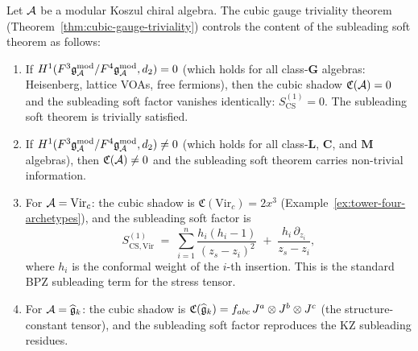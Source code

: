 \begin{theorem}
\label{thm:thqg-VI-cubic-gauge-triviality}
Let $\mathcal{A}$ be a modular Koszul chiral algebra.
The cubic gauge triviality theorem
(Theorem~\ref{thm:cubic-gauge-triviality}) controls the content
of the subleading soft theorem as follows:
\begin{enumerate}[label=\textup{(\roman*)}]
\item If $H^1(F^3\mathfrak{g}_{\mathcal{A}}^{\mathrm{mod}}/F^4\mathfrak{g}_{\mathcal{A}}^{\mathrm{mod}}, d_2) = 0$ (which holds for all
 class-$\mathbf{G}$ algebras: Heisenberg, lattice VOAs, free
 fermions), then the cubic shadow $\mathfrak{C}(\mathcal{A}) = 0$ and
 the subleading soft factor vanishes identically:
 $S^{(1)}_{\mathrm{CS}} = 0$.
 The subleading soft theorem is trivially satisfied.
\item If $H^1(F^3\mathfrak{g}_{\mathcal{A}}^{\mathrm{mod}}/F^4\mathfrak{g}_{\mathcal{A}}^{\mathrm{mod}}, d_2) \neq 0$ (which holds
 for all class-$\mathbf{L}$, $\mathbf{C}$, and $\mathbf{M}$
 algebras), then $\mathfrak{C}(\mathcal{A}) \neq 0$ and the subleading
 soft theorem carries non-trivial information.
\item For $\mathcal{A} = \mathrm{Vir}_c$: the cubic shadow is
 $\mathfrak{C}(\mathrm{Vir}_c) = 2x^3$
 (Example~\ref{ex:tower-four-archetypes}), and the subleading
 soft factor is
 \begin{equation}\label{eq:thqg-VI-vir-subleading}
 S^{(1)}_{\mathrm{CS},\mathrm{Vir}}
 \;=\;
 \sum_{i=1}^{n}
 \frac{h_i(h_i - 1)}{(z_s - z_i)^2}
 \;+\;
 \frac{h_i\,\partial_{z_i}}{z_s - z_i},
 \end{equation}
 where $h_i$ is the conformal weight of the $i$-th insertion.
 This is the standard BPZ subleading term for the stress tensor.
\item For $\mathcal{A} = \widehat{\mathfrak{g}}_k$: the cubic shadow is
 $\mathfrak{C}(\widehat{\mathfrak{g}}_k) = f_{abc}\,J^a \otimes J^b
 \otimes J^c$ (the structure-constant tensor), and the subleading
 soft factor reproduces the KZ subleading residues.
\end{enumerate}
\end{theorem}

